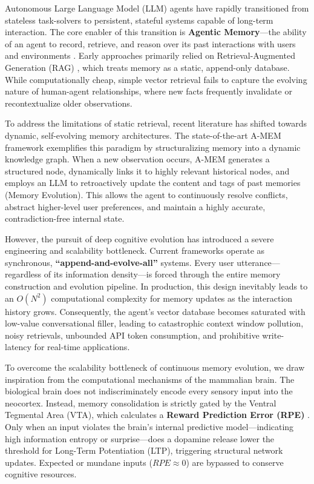\documentclass{article}
\begin{document}
Autonomous Large Language Model (LLM) agents have rapidly transitioned from stateless task-solvers to persistent, stateful systems capable of long-term interaction. The core enabler of this transition is \textbf{Agentic Memory}---the ability of an agent to record, retrieve, and reason over its past interactions with users and environments \citep{park2023generative, packer2024memgpt}. Early approaches primarily relied on Retrieval-Augmented Generation (RAG) \citep{lewis2020retrieval}, which treats memory as a static, append-only database. While computationally cheap, simple vector retrieval fails to capture the evolving nature of human-agent relationships, where new facts frequently invalidate or recontextualize older observations.

To address the limitations of static retrieval, recent literature has shifted towards dynamic, self-evolving memory architectures. The state-of-the-art A-MEM framework \citep{amem2025} exemplifies this paradigm by structuralizing memory into a dynamic knowledge graph. When a new observation occurs, A-MEM generates a structured node, dynamically links it to highly relevant historical nodes, and employs an LLM to retroactively update the content and tags of past memories (Memory Evolution). This allows the agent to continuously resolve conflicts, abstract higher-level user preferences, and maintain a highly accurate, contradiction-free internal state. 

However, the pursuit of deep cognitive evolution has introduced a severe engineering and scalability bottleneck. Current frameworks operate as synchronous, \textbf{``append-and-evolve-all''} systems. Every user utterance---regardless of its information density---is forced through the entire memory construction and evolution pipeline. In production, this design inevitably leads to an $O(N^2)$ computational complexity for memory updates as the interaction history grows. Consequently, the agent's vector database becomes saturated with low-value conversational filler, leading to catastrophic context window pollution, noisy retrievals, unbounded API token consumption, and prohibitive write-latency for real-time applications.

To overcome the scalability bottleneck of continuous memory evolution, we draw inspiration from the computational mechanisms of the mammalian brain. The biological brain does not indiscriminately encode every sensory input into the neocortex. Instead, memory consolidation is strictly gated by the Ventral Tegmental Area (VTA), which calculates a \textbf{Reward Prediction Error (RPE)} \citep{schultz1997neural}. Only when an input violates the brain's internal predictive model---indicating high information entropy or surprise---does a dopamine release lower the threshold for Long-Term Potentiation (LTP), triggering structural network updates. Expected or mundane inputs ($RPE \approx 0$) are bypassed to conserve cognitive resources.
\end{document}
